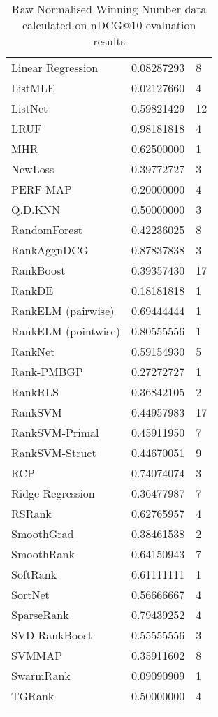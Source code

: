 \begin{longtable}{l|l|l}
Linear Regression & 0.08287293 & 8 \\ 
List\acs{MLE} & 0.02127660 & 4 \\ 
ListNet & 0.59821429 & 12 \\ 
LRUF & 0.98181818 & 4 \\ 
MHR & 0.62500000 & 1 \\ 
NewLoss & 0.39772727 & 3 \\ 
PERF-\acs{MAP} & 0.20000000 & 4 \\ 
Q.D.\acs{KNN} & 0.50000000 & 3 \\ 
RandomForest & 0.42236025 & 8 \\ 
RankAgg\acs{nDCG} & 0.87837838 & 3 \\ 
RankBoost & 0.39357430 & 17 \\ 
RankDE & 0.18181818 & 1 \\ 
RankELM (pairwise) & 0.69444444 & 1 \\ 
RankELM (pointwise) & 0.80555556 & 1 \\ 
RankNet & 0.59154930 & 5 \\ 
Rank-PMBGP & 0.27272727 & 1 \\ 
Rank\acs{RLS} & 0.36842105 & 2 \\ 
Rank\acs{SVM} & 0.44957983 & 17 \\ 
Rank\acs{SVM}-Primal & 0.45911950 & 7 \\ 
Rank\acs{SVM}-Struct & 0.44670051 & 9 \\ 
RCP & 0.74074074 & 3 \\ 
Ridge Regression & 0.36477987 & 7 \\ 
RSRank & 0.62765957 & 4 \\ 
SmoothGrad & 0.38461538 & 2 \\ 
SmoothRank & 0.64150943 & 7 \\ 
SoftRank & 0.61111111 & 1 \\ 
SortNet & 0.56666667 & 4 \\ 
SparseRank & 0.79439252 & 4 \\ 
\acs{SVD}-RankBoost & 0.55555556 & 3 \\ 
\acs{SVM}\acs{MAP} & 0.35911602 & 8 \\ 
SwarmRank & 0.09090909 & 1 \\ 
TGRank & 0.50000000 & 4 \\ 
\caption{Raw Normalised Winning Number data calculated on \acs{nDCG}@10 evaluation results}
\label{tab:raw_data_norm_winnum_ndcg10}
\end{longtable}